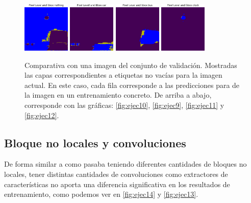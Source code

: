 \begin{figure}[h!tpb]
  \vrule
  \includegraphics[width=0.2\textwidth]{../../modelos-entrenados/unet-conv/ejecucion12/predvalmid0}
  \vrule
  \includegraphics[width=0.2\textwidth]{../../modelos-entrenados/unet-conv/ejecucion12/predvalmid3}
  \vrule
  \includegraphics[width=0.2\textwidth]{../../modelos-entrenados/unet-conv/ejecucion12/predvalmid6}
  \vrule
  \includegraphics[width=0.2\textwidth]{../../modelos-entrenados/unet-conv/ejecucion12/predvalmid85}
  \caption{Comparativa con una imagen del conjunto de validación. Mostradas las capas correspondientes a etiquetas no vacías para la imagen actual. En este caso, cada fila corresponde a las predicciones para de la imagen en un entrenamiento concreto. De arriba a abajo, corresponde con las gráficas: \autoref{fig:ejec10}, \autoref{fig:ejec9}, \autoref{fig:ejec11} y \autoref{fig:ejec12}.}
  \label{fig:comparativa1-val}
\end{figure}
\newpage
\subsection{Bloque no locales y convoluciones}
De forma similar a como pasaba teniendo diferentes cantidades de bloques no locales, tener distintas cantidades de convoluciones como extractores de características no aporta una diferencia significativa en los resultados de entrenamiento, como podemos ver en \autoref{fig:ejec14} y \autoref{fig:ejec13}. \\

